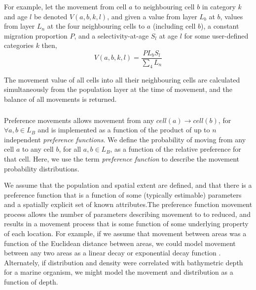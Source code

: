 For example, let the movement from cell $a$ to neighbouring cell $b$ in category $k$ and age $l$ be denoted $V(a,b,k,l)$, and given a value from layer $L_b$  at $b$, values from layer $L_n$ at the four neighbouring cells to $a$ (including cell $b$), a constant migration proportion $P$, and a selectivity-at-age $S_l$ at age $l$ for some user-defined categories $k$ then, 
\begin{equation}
  V(a,b,k,l) = \frac{P L_b S_l }{\sum\limits_4 L_n}
\end{equation}

The movement value of all cells into all their neighbouring cells are calculated simultaneously from the population layer at the time of movement, and the balance of all movements is returned.

\subsubsection{}

Preference movements allows movement from any $cell(a) \rightarrow cell(b)$, for $\forall a,b \in L_B$ and is implemented as a function of the product of up to $n$ independent \emph{preference functions}. We define the probability of moving from any cell $a$ to any cell $b$, for all $a,b \in L_B$, as a function of the relative preference for that cell. Here, we use the term \emph{preference function} \citep{1366,1367} to describe the movement probability distributions. 

We assume that the population and spatial extent are defined, and that there is a preference function that is a function of some (typically estimable) parameters and a spatially explicit set of known attributes.The preference function movement process allows the number of parameters describing movement to to reduced, and results in a movement process that is some function of some underlying property of each location. For example, if we assume that movement between areas was a function of the Euclidean distance between areas, we could model movement between any two areas as a linear decay or exponential decay function \citep{1366}. Alternately, if distribution and density were correlated with bathymetric depth for a marine organism, we might model the movement and distribution as a function of depth. 

